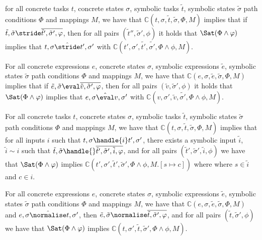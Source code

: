 \begin{lemma}
  for all concrete tasks $t$, concrete states $\sigma$, symbolic tasks $\tilde{t}$, symbolic states $\tilde{\sigma}$ path conditions $\Phi$ and mappings $M$,
  we have that $\mathds{C}(t,\sigma,\tilde{t},\tilde{\sigma},\Phi,M)$ implies
  that if $\tilde{t},\tilde{\sigma}\stride\overline{\tilde{t}',\tilde{\sigma}',\phi}$,
  then for all pairs $(\tilde{t}'',\tilde{\sigma}',\phi)$ it holds that $\Sat(\Phi\land\phi)$ implies
  that $t,\sigma\hat{\stride}t',\sigma'$ with $\mathds{C}(t',\sigma',\tilde{t'},\tilde{\sigma'},\Phi\land\phi,M)$.
\end{lemma}

\begin{lemma}
  For all concrete expressions $e$, concrete states $\sigma$, symbolic expressions $\tilde{e}$, symbolic states $\tilde{\sigma}$ path conditions $\Phi$ and mappings $M$,
  we have that $\mathds{C}(e,\sigma,\tilde{e},\tilde{\sigma},\Phi,M)$ implies
  that if $\tilde{e},\tilde{\sigma}\eval\overline{\tilde{v},\tilde{\sigma}',\phi}$,
  then for all pairs $(\tilde{v},\tilde{\sigma}',\phi)$ it holds that $\Sat(\Phi\land\phi)$ implies
  that $e,\sigma\hat{\eval}v,\sigma'$ with $\mathds{C}(v,\sigma',\tilde{v},\tilde{\sigma'},\Phi\land\phi,M)$.
\end{lemma}




\begin{lemma}
  \label{lem:completeHandle}
  For all concrete tasks $t$, concrete states $\sigma$, symbolic tasks $\tilde{t}$, symbolic states $\tilde{\sigma}$ path conditions $\Phi$ and mappings $M$,
  we have that $\mathds{C}(t,\sigma,\tilde{t},\tilde{\sigma},\Phi,M)$ implies
  that for all inputs $i$ such that $t,\sigma\handle{i}t',\sigma'$,
  there exists a symbolic input $\tilde{i}$, $\tilde{i}\sim i$ such that
  $\tilde{t},\tilde{\sigma}\handle{}\overline{\tilde{t}',\tilde{\sigma}',\tilde{i},\phi}$,
  and for all pairs $(\tilde{t}',\tilde{\sigma}',\tilde{i},\phi)$ we have that $\Sat(\Phi\land\phi)$ implies $\mathds{C}(t',\sigma',\tilde{t}',\tilde{\sigma}',\Phi\land\phi,M.[s\mapsto c])$ where where $s\in\tilde{i}$ and $c\in i$.
\end{lemma}

\begin{lemma}
  \label{lem:completeNormalise}
  For all concrete expressions $e$, concrete states $\sigma$, symbolic expressions $\tilde{e}$, symbolic states $\tilde{\sigma}$ path conditions $\Phi$ and mappings $M$,
  we have that $\mathds{C}(e,\sigma,\tilde{e},\tilde{\sigma},\Phi,M)$
  and $e,\sigma\hat{\normalise} t,\sigma'$,
  then $\tilde{e},\tilde{\sigma}\normalise\overline{\tilde{t},\tilde{\sigma}',\phi}$,
  and for all pairs $(\tilde{t},\tilde{\sigma}',\phi)$ we have that $\Sat(\Phi\land\phi)$ implies $\mathds{C}(t,\sigma',\tilde{t},\tilde{\sigma}',\Phi\land\phi,M)$.
\end{lemma}

